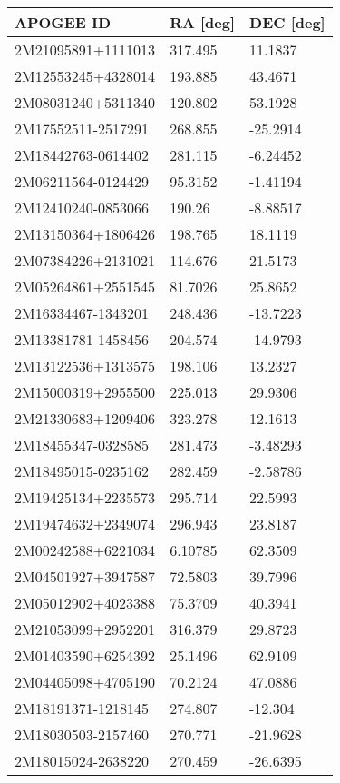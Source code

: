 \documentclass[fleqn,usenatbib]{mnras}
\begin{document}
\begin{table}
\centering
  \begin{tabular}{lll}
  \toprule
  APOGEE ID  &       RA [deg] &       DEC [deg]                                     \\
  \midrule
2M21095891+1111013 &  317.495 &  11.1837 \\
2M12553245+4328014 &  193.885 &  43.4671 \\
2M08031240+5311340 &  120.802 &  53.1928 \\
2M17552511-2517291 &  268.855 & -25.2914 \\
2M18442763-0614402 &  281.115 & -6.24452 \\
2M06211564-0124429 &  95.3152 & -1.41194 \\
2M12410240-0853066 &   190.26 & -8.88517 \\
2M13150364+1806426 &  198.765 &  18.1119 \\
2M07384226+2131021 &  114.676 &  21.5173 \\
2M05264861+2551545 &  81.7026 &  25.8652 \\
2M16334467-1343201 &  248.436 & -13.7223 \\
2M13381781-1458456 &  204.574 & -14.9793 \\
2M13122536+1313575 &  198.106 &  13.2327 \\
2M15000319+2955500 &  225.013 &  29.9306 \\
2M21330683+1209406 &  323.278 &  12.1613 \\
2M18455347-0328585 &  281.473 & -3.48293 \\
2M18495015-0235162 &  282.459 & -2.58786 \\
2M19425134+2235573 &  295.714 &  22.5993 \\
2M19474632+2349074 &  296.943 &  23.8187 \\
2M00242588+6221034 &  6.10785 &  62.3509 \\
2M04501927+3947587 &  72.5803 &  39.7996 \\
2M05012902+4023388 &  75.3709 &  40.3941 \\
2M21053099+2952201 &  316.379 &  29.8723 \\
2M01403590+6254392 &  25.1496 &  62.9109 \\
2M04405098+4705190 &  70.2124 &  47.0886 \\
2M18191371-1218145 &  274.807 &  -12.304 \\
2M18030503-2157460 &  270.771 & -21.9628 \\
2M18015024-2638220 &  270.459 & -26.6395 \\

\end{tabular}
\end{table}
\end{document}
